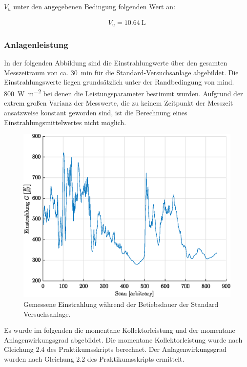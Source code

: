 $V_u$ unter den angegebenen Bedingung folgenden Wert an:

\begin{equation*}
	\label{MAG-Ber.}
	\begin{aligned}
	V_u=  \SI{10,64}{\liter}
	\end{aligned}
\end{equation*}

\subsubsection{Anlagenleistung}

In der folgenden Abbildung sind die Einstrahlungwerte über den gesamten Messzeitraum von ca. \SI{30}{\minute} für die Standard-Versuchsanlage abgebildet. 
Die Einstrahlungswerte liegen grundsätzlich unter der Randbedingung von mind. \SI{800}{\watt\per\meter\squared} bei denen die Leistungsparameter bestimmt wurden. Aufgrund der extrem großen Varianz der Messwerte, die zu keinem Zeitpunkt der Messzeit ansatzweise konstant geworden sind, ist die Berechnung eines Einstrahlungsmittelwertes nicht möglich. 

\begin{figure}[H]
	\centering
	\includegraphics[height=0.3\textheight]{../DATA/DataEinstrahlung.eps}
	\caption[Gemessene Einstrahlung während der Betiebsdauer der Standard Versuchsanlage]{Gemessene Einstrahlung während der Betiebsdauer der Standard Versuchsanlage.}
	\label{fig:Einstrahlung}
\end{figure}

Es wurde im folgenden die momentane Kollektorleistung und der momentane Anlagenwirkungsgrad abgebildet. 
Die momentane Kollektorleistung wurde nach Gleichung 2.4 des Praktikumsskripts berechnet. Der Anlagenwirkungsgrad wurden nach Gleichung 2.2 des Praktikumsskripts ermittelt. 

